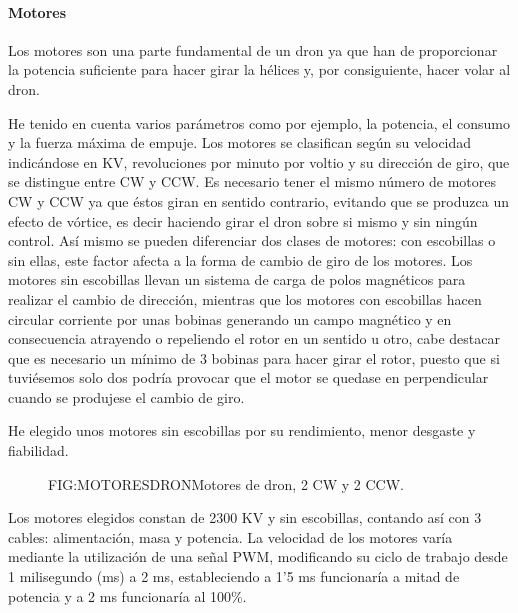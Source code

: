 
\paragraph{Motores}
\label{SSS:Motores}

Los motores son una parte fundamental de un dron ya que han de proporcionar la potencia suficiente para hacer girar la hélices y, por consiguiente, hacer volar al dron. 
                
 He tenido en cuenta varios parámetros como por ejemplo, la potencia, el consumo y la fuerza máxima de empuje. 
 Los motores se clasifican según su velocidad indicándose en KV, revoluciones por minuto por voltio y su dirección de giro, que se distingue entre CW y CCW. Es necesario tener el mismo número de motores CW y CCW ya que éstos giran en sentido contrario, evitando que se produzca un efecto de vórtice, es decir haciendo girar el dron sobre si mismo y sin ningún control. \linebreak Así mismo se pueden diferenciar dos clases de motores: con escobillas o sin ellas, este factor afecta a la forma de cambio de giro de los motores. Los motores sin escobillas llevan un sistema de carga de polos magnéticos para realizar el cambio de dirección, mientras que los motores con escobillas hacen circular corriente por unas bobinas generando un campo magnético y en consecuencia atrayendo o repeliendo el rotor en un sentido u otro, cabe destacar que es necesario un mínimo de 3 bobinas para hacer girar el rotor, puesto que si tuviésemos solo dos podría provocar que el motor se quedase en perpendicular cuando se produjese el cambio de giro.

 He elegido unos motores sin escobillas por su rendimiento, menor desgaste y fiabilidad. 
 
 \begin{figure}[Motores dron]{FIG:MOTORESDRON}{Motores de dron, 2 CW y 2 CCW.}
\end{figure}
                
 Los motores elegidos constan de 2300 KV y sin escobillas, contando así con 3 cables: alimentación, masa y potencia. La velocidad de los motores varía mediante la utilización de una señal PWM, modificando su ciclo de trabajo desde 1 milisegundo (ms) a 2 ms, estableciendo a 1'5 ms funcionaría a mitad de potencia y a 2 ms funcionaría al 100\%.
 
